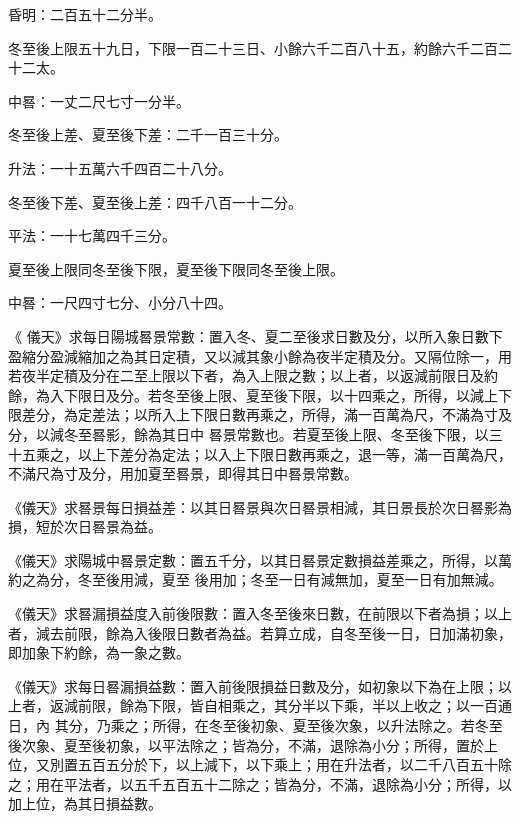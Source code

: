 \begin{pinyinscope}
 昏明：二百五十二分半。



 冬至後上限五十九日，下限一百二十三日、小餘六千二百八十五，約餘六千二百二十二太。



 中晷：一丈二尺七寸一分半。



 冬至後上差、夏至後下差：二千一百三十分。



 升法：一十五萬六千四百二十八分。



 冬至後下差、夏至後上差：四千八百一十二分。



 平法：一十七萬四千三分。



 夏至後上限同冬至後下限，夏至後下限同冬至後上限。



 中晷：一尺四寸七分、小分八十四。



 《
 儀天》求每日陽城晷景常數：置入冬、夏二至後求日數及分，以所入象日數下盈縮分盈減縮加之為其日定積，又以減其象小餘為夜半定積及分。又隔位除一，用若夜半定積及分在二至上限以下者，為入上限之數；以上者，以返減前限日及約餘，為入下限日及分。若冬至後上限、夏至後下限，以十四乘之，所得，以減上下限差分，為定差法；以所入上下限日數再乘之，所得，滿一百萬為尺，不滿為寸及分，以減冬至晷影，餘為其日中
 晷景常數也。若夏至後上限、冬至後下限，以三十五乘之，以上下差分為定法；以入上下限日數再乘之，退一等，滿一百萬為尺，不滿尺為寸及分，用加夏至晷景，即得其日中晷景常數。



 《儀天》求晷景每日損益差：以其日晷景與次日晷景相減，其日景長於次日晷影為損，短於次日晷景為益。



 《儀天》求陽城中晷景定數：置五千分，以其日晷景定數損益差乘之，所得，以萬約之為分，冬至後用減，夏至
 後用加；冬至一日有減無加，夏至一日有加無減。



 《儀天》求晷漏損益度入前後限數：置入冬至後來日數，在前限以下者為損；以上者，減去前限，餘為入後限日數者為益。若算立成，自冬至後一日，日加滿初象，即加象下約餘，為一象之數。



 《儀天》求每日晷漏損益數：置入前後限損益日數及分，如初象以下為在上限；以上者，返減前限，餘為下限，皆自相乘之，其分半以下乘，半以上收之；以一百通日，內
 其分，乃乘之；所得，在冬至後初象、夏至後次象，以升法除之。若冬至後次象、夏至後初象，以平法除之；皆為分，不滿，退除為小分；所得，置於上位，又別置五百五分於下，以上減下，以下乘上；用在升法者，以二千八百五十除之；用在平法者，以五千五百五十二除之；皆為分，不滿，退除為小分；所得，以加上位，為其日損益數。




\end{pinyinscope}
